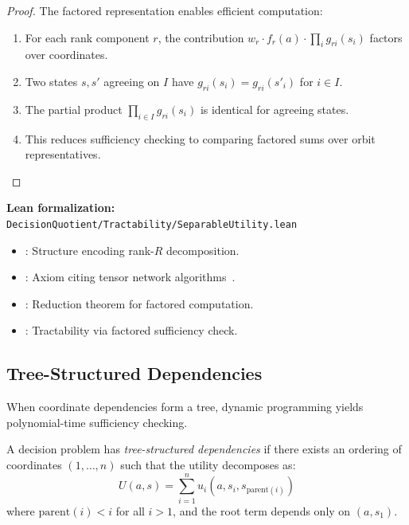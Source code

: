 \begin{proof}
The factored representation enables efficient computation:
\begin{enumerate}
\item For each rank component $r$, the contribution $w_r \cdot f_r(a) \cdot \prod_i g_{ri}(s_i)$ factors over coordinates.
\item Two states $s, s'$ agreeing on $I$ have $g_{ri}(s_i) = g_{ri}(s'_i)$ for $i \in I$.
\item The partial product $\prod_{i \in I} g_{ri}(s_i)$ is identical for agreeing states.
\item This reduces sufficiency checking to comparing factored sums over orbit representatives.
\end{enumerate}
\end{proof}

\noindent\textbf{Lean formalization:} \texttt{DecisionQuotient/Tractability/SeparableUtility.lean}
\begin{itemize}
\item {}: Structure encoding rank-$R$ decomposition.
\item {}: Axiom citing tensor network algorithms~\cite{kolda2009tensor,cichocki2016tensor}.
\item {}: Reduction theorem for factored computation.
\item {}: Tractability via factored sufficiency check.
\end{itemize}

\subsection{Tree-Structured Dependencies}\label{sec:tract-tree}

When coordinate dependencies form a tree, dynamic programming yields polynomial-time sufficiency checking.

\begin{definition}\label{def:tree-struct}
A decision problem has \emph{tree-structured dependencies} if there exists an ordering of coordinates $(1, \ldots, n)$ such that the utility decomposes as:
\[
U(a, s) = \sum_{i=1}^n u_i(a, s_i, s_{\mathrm{parent}(i)})
\]
where $\mathrm{parent}(i) < i$ for all $i > 1$, and the root term depends only on $(a, s_1)$.
\end{definition}

